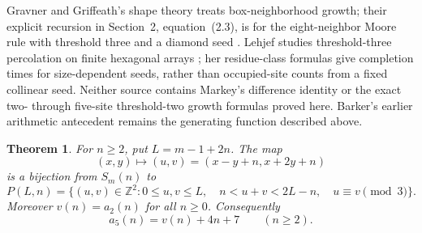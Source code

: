 \documentclass[11pt]{article}
\newtheorem{theorem}{Theorem}
\newcommand{\Z}{\mathbb Z}
\begin{document}
Gravner and Griffeath's shape theory treats box-neighborhood growth;
their explicit recursion in Section~2, equation~(2.3), is for the
eight-neighbor Moore rule with threshold three and a diamond seed
\cite{gravner}. Lehjef studies threshold-three percolation on finite
hexagonal arrays \cite[Sections~3.2 and 4]{lehjef}; her residue-class
formulas give completion times for size-dependent seeds, rather than
occupied-site counts from a fixed collinear seed. Neither source contains
Markey's difference identity or the exact two- through five-site
threshold-two growth formulas proved here. Barker's earlier arithmetic
antecedent remains the generating function described above.

\begin{theorem}\label{thm:main}
For $n\geq2$, put $L=m-1+2n$. The map
\[
 (x,y)\longmapsto(u,v)=(x-y+n,x+2y+n)
\]
is a bijection from $S_m(n)$ to
\begin{equation}\label{eq:polygon}
 P(L,n)=\{(u,v)\in\Z^2:0\leq u,v\leq L,\quad
 n<u+v<2L-n,\quad u\equiv v\pmod3\}.
\end{equation}
Moreover $v(n)=a_2(n)$ for all $n\geq0$. Consequently
\begin{equation}\label{eq:difference}
 a_5(n)=v(n)+4n+7\qquad(n\geq2).
\end{equation}
\end{theorem}
\end{document}
